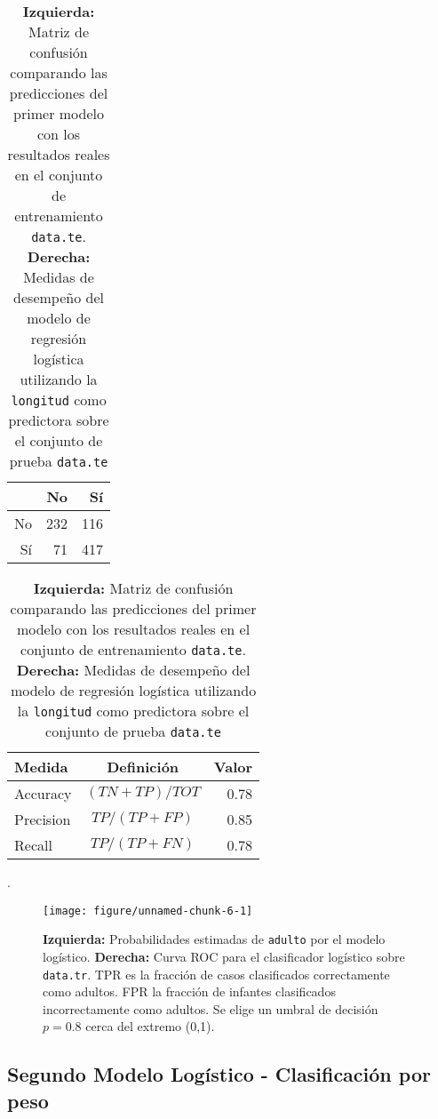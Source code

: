 \documentclass[a4paper]{article}\usepackage[]{graphicx}\usepackage[]{color}
\makeatletter
\def\maxwidth{ %
  \ifdim\Gin@nat@width>\linewidth
    \linewidth
  \else
    \Gin@nat@width
  \fi
}
\newenvironment{knitrout}{}{} %
\makeatother
\begin{document}
\begin{table}[ht]
\centering
\begin{tabular}{rrr}
  \hline
 & No & Sí \\ 
  \hline
No & 232 & 116 \\ 
  Sí &  71 & 417 \\ 
   \hline
\end{tabular}
\hspace{4cm}
\begin{tabular}{l c r}
\hline
Medida 				& Definición		& Valor\\
\hline
Accuracy 			& $(TN+TP)/TOT$ & 0.78\\
Precision 			& $TP/(TP+FP)$  & 0.85\\
Recall 				& $TP/(TP+FN)$  & 0.78\\
\hline
\end{tabular}
\caption{\textbf{Izquierda:} Matriz de confusión comparando las predicciones del primer modelo con los resultados reales en el conjunto de entrenamiento \texttt{\textcolor{BurntOrange}{data.te}}. \textbf{Derecha:} Medidas de desempeño del modelo de regresión logística utilizando la \texttt{\textcolor{BurntOrange}{longitud}} como predictora sobre el conjunto de prueba \texttt{\textcolor{BurntOrange}{data.te}}}.
\label{tab:medidas1}
\end{table}

\begin{figure}[H]
\caption{\textbf{Izquierda:} Probabilidades estimadas de \texttt{\textcolor{BurntOrange}{adulto}} por el modelo logístico. \textbf{Derecha:} Curva ROC para el clasificador logístico sobre \texttt{\textcolor{BurntOrange}{data.tr}}. TPR es la fracción de casos clasificados correctamente como adultos. FPR la fracción de infantes clasificados incorrectamente como adultos. Se elige un umbral de decisión $p=0.8$ cerca del extremo (0,1).}
\label{fig:model1}
\begin{knitrout}
\color{fgcolor}

{\centering \texttt{[image: figure/unnamed-chunk-6-1]} 

}



\end{knitrout}
\end{figure}

\clearpage
\subsection{Segundo Modelo Logístico - Clasificación por peso}
\end{document}

